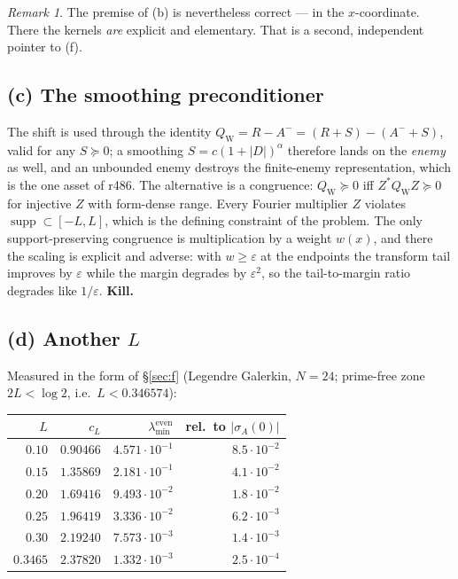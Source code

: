 \documentclass[11pt]{article}
\theoremstyle{remark}
\newtheorem{remark}{Remark}
\newcommand{\QW}{Q_{\mathrm W}}
\begin{document}
\begin{remark}
The premise of (b) is nevertheless correct --- in the
$x$-coordinate.  There the kernels \emph{are} explicit and
elementary.  That is a second, independent pointer to (f).
\end{remark}

\subsection{(c) The smoothing preconditioner}\label{sec:c}

The shift is used through the identity
$\QW=R-A^-=(R+S)-(A^-+S)$, valid for any $S\succeq0$;
a smoothing $S=c(1+|D|)^\alpha$ therefore lands on the
\emph{enemy} as well, and an unbounded enemy destroys the
finite-enemy representation, which is the one asset of
r486.
The alternative is a congruence: $\QW\succeq0$ iff
$Z^*\QW Z\succeq0$ for injective $Z$ with form-dense range.
Every Fourier multiplier $Z$ violates
$\operatorname{supp}\subset[-L,L]$, which is the defining
constraint of the problem.  The only support-preserving
congruence is multiplication by a weight $w(x)$, and there the
scaling is explicit and adverse: with $w\ge\varepsilon$ at the
endpoints the transform tail improves by $\varepsilon$ while
the margin degrades by $\varepsilon^2$, so the
tail-to-margin ratio degrades like $1/\varepsilon$.
\textbf{Kill.}

\subsection{(d) Another $L$}\label{sec:d}

Measured in the form of \S\ref{sec:f} (Legendre Galerkin,
$N=24$; prime-free zone $2L<\log2$, i.e.\ $L<0.346574$):

\begin{center}
\small
\begin{tabular}{@{}rrrr@{}}
\toprule
$L$ & $c_L$ & $\lambda_{\min}^{\mathrm{even}}$
  & rel.\ to $|\sigma_A(0)|$ \\
\midrule
$0.10$ & $0.90466$ & $4.571\cdot10^{-1}$ & $8.5\cdot10^{-2}$ \\
$0.15$ & $1.35869$ & $2.181\cdot10^{-1}$ & $4.1\cdot10^{-2}$ \\
$0.20$ & $1.69416$ & $9.493\cdot10^{-2}$ & $1.8\cdot10^{-2}$ \\
$0.25$ & $1.96419$ & $3.336\cdot10^{-2}$ & $6.2\cdot10^{-3}$ \\
$0.30$ & $2.19240$ & $7.573\cdot10^{-3}$ & $1.4\cdot10^{-3}$ \\
$0.3465$ & $2.37820$ & $1.332\cdot10^{-3}$ & $2.5\cdot10^{-4}$ \\
\bottomrule
\end{tabular}
\end{center}
\end{document}
